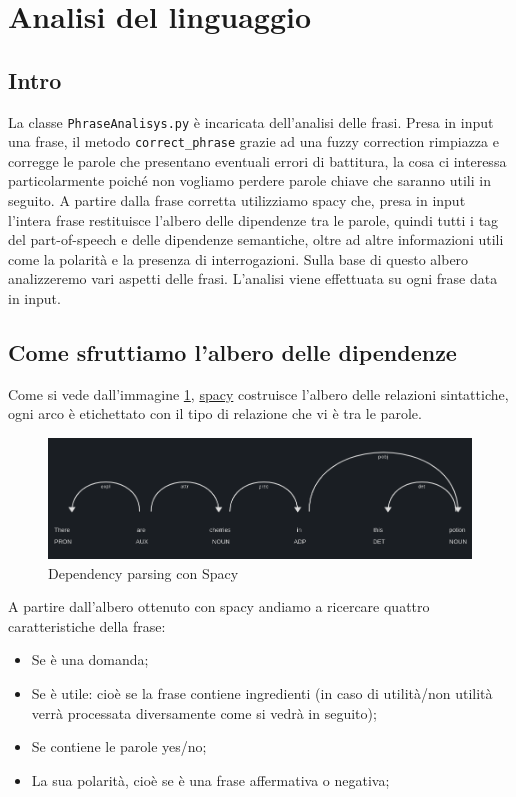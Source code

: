 \section{Analisi del linguaggio}
\subsection{Intro}
La classe \texttt{PhraseAnalisys.py} è incaricata dell'analisi delle frasi.
Presa in input una frase, il metodo \texttt{correct\_phrase} grazie ad una fuzzy correction rimpiazza e corregge le parole che presentano eventuali errori di battitura, la cosa ci interessa particolarmente poiché non vogliamo perdere parole chiave che saranno utili in seguito.
A partire dalla frase corretta  utilizziamo spacy che, presa in input l'intera frase restituisce l'albero delle dipendenze tra le parole, quindi tutti i tag del part-of-speech e delle dipendenze semantiche, oltre ad altre informazioni utili come la polarità e la presenza di interrogazioni. Sulla base di questo albero analizzeremo vari aspetti delle frasi. L'analisi viene effettuata su ogni frase data in input.
\subsection{Come sfruttiamo l'albero delle dipendenze}
Come si vede dall'immagine \ref{fig:Spacy}, \href{https://spacy.io/}{spacy} costruisce l'albero delle relazioni sintattiche, ogni arco è etichettato con il tipo di relazione che vi è tra le parole.
\begin{figure}[h]
    \centering
    \includegraphics[scale=0.45]{Images/imgSpacy.png}
    \caption{Dependency parsing con Spacy}
    \label{fig:Spacy}
\end{figure}
A partire dall'albero ottenuto con spacy andiamo a ricercare quattro caratteristiche della frase:
\begin{itemize}
    \item Se è una domanda;
    \item Se è utile: cioè se la frase contiene ingredienti (in caso di utilità/non utilità verrà processata diversamente come si vedrà in seguito);
    \item Se contiene le parole yes/no;
    \item La sua polarità, cioè se è una frase affermativa o negativa;
\end{itemize}
